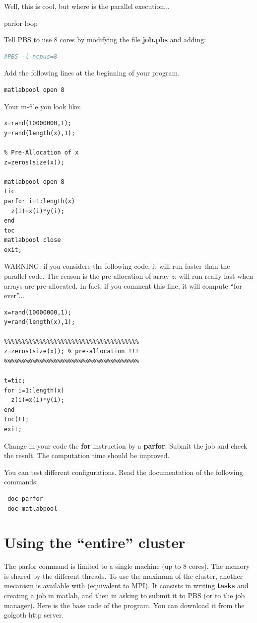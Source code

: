 \documentclass{emse-exo}
\begin{document}
Well, this is cool, but where is the parallel execution...
\begin{question}{parfor loop}
 \item Tell PBS to use 8 cores by modifying the file \textbf{job.pbs} and adding:
\begin{lstlisting}[language=sh]
#PBS -l ncpus=8
\end{lstlisting}

 \item Add the following lines at the beginning of your \matlabregistered{} program.
\begin{lstlisting}
matlabpool open 8
\end{lstlisting}
Your m-file you look like:
\begin{lstlisting}
x=rand(10000000,1);
y=rand(length(x),1);

% Pre-Allocation of x
z=zeros(size(x));

matlabpool open 8
tic
parfor i=1:length(x)
  z(i)=x(i)*y(i);
end
toc
matlabpool close
exit;
\end{lstlisting}

WARNING:
if you considere the following code, it will run faster than the parallel code. The reason is the pre-allocation of array $z$: \matlabregistered{} will run really fast when arrays are pre-allocated. In fact, if you comment this line, it will compute ``for ever''...
\begin{lstlisting}
x=rand(10000000,1);
y=rand(length(x),1);

%%%%%%%%%%%%%%%%%%%%%%%%%%%%%%%%%%%%%%
z=zeros(size(x)); % pre-allocation !!!
%%%%%%%%%%%%%%%%%%%%%%%%%%%%%%%%%%%%%%

t=tic;
for i=1:length(x)
  z(i)=x(i)*y(i);
end
toc(t);
exit;
\end{lstlisting}


 \item Change in your \matlabregistered{} code the \textbf{for} instruction by a \textbf{parfor}. Submit the job and check the result. The computation time should be improved.
 \item You can test different configurations. Read the documentation of the following commands:
\begin{lstlisting}
 doc parfor
 doc matlabpool
\end{lstlisting}

\end{question}


\section{Using the ``entire'' cluster}
The parfor command is limited to a single machine (up to 8 cores). The memory is shared by the different threads. To use the maximum of the cluster, another mecanism is available with \matlabregistered{} (equivalent to MPI). It consists in writing \textbf{tasks} and creating a job in matlab, and then in asking \matlabregistered{} to submit it to PBS (or to the job manager). Here is the base code of the program. You can download it from the golgoth http server.
\end{document}
